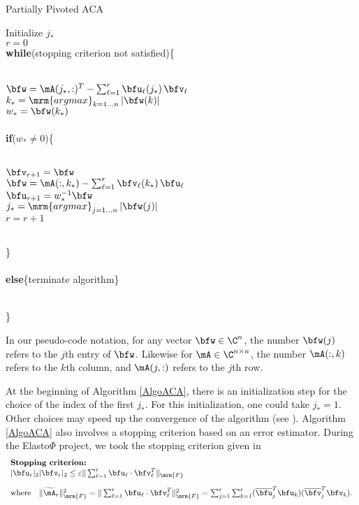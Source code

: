 \begin{algorithm}
  \caption{Partially Pivoted ACA}  
  \label{AlgoACA}
  Initialize $j_{*}$\\
  $r=0$\\
  \textbf{while}(stopping criterion not satisfied)\{\\\quad\\
  \indent\hspace{0.5cm} \parbox{\linewidth}{
    $\bfw = \mA(j_{*},:)^{T} - \sum_{\ell=1}^{r}\bfu_{\ell}(j_{*})\,\bfv_{\ell}$\\
    $k_{*} = \mathop{\mrm{argmax}}_{k = 1\dots n}\vert \bfw(k)\vert$\\
    $w_{*} = \bfw(k_{*})$\\\quad\\
    \textbf{if}($w_{*}\neq 0$)\{\\\quad\\
    \indent\hspace{0.5cm} \parbox{\linewidth}{
      $\bfv_{r+1} = \bfw$\\
      $\bfw = \mA(:,k_{*})-\sum_{\ell = 1}^{r}\bfv_{\ell}(k_{*})\,\bfu_{\ell} $\\
      $\bfu_{r+1} = w_{*}^{-1}\bfw$\\      
      $j_{*} = \mathop{\mrm{argmax}}_{j = 1\dots n} \vert \bfw(j)\vert$\\
      $r=r+1$
    }
    \quad\\
    \}\\\quad\\
    \textbf{else}\{terminate algorithm\}
    }\\
  \}

\end{algorithm}

\bigskip
In our pseudo-code notation, for any vector $\bfw\in \C^{n}$, the number $\bfw(j)$  refers to the $j$th entry of $\bfw$. 
Likewise for $\mA\in \C^{n\times n}$, the number $\mA(:,k)$ refers to the $k$th column, and $\mA(j,:)$ refers to the $j$th
row.

\bigskip
At the beginning of Algorithm \ref{AlgoACA}, there is an initialization step for the choice of the index of the first $j_{*}$. 
For this initialization, one could take $j_{*} = 1$. Other choices may speed up the convergence of the algorithm (see \cite[Section 3.4.3]{Bebendorf2008}). Algorithm \ref{AlgoACA} also involves a stopping criterion based on an error estimator. During the Elasto$\Phi$ 
project, we took the stopping criterion given in \cite{Rjasanow2007}
\begin{equation}
\label{eq:stopCrit}
\begin{array}{l}
\textbf{Stopping criterion:}\\ 
\vert \bfu_{r}\vert_{2}\vert \bfv_{r}\vert_{2}\leq  \varepsilon\Vert \sum_{\ell = 1}^{r}\bfu_{\ell}\cdot\bfv_{\ell}^{T}\Vert_{\mrm{F}}\\[10pt]
\textrm{where}\quad \Vert \widetilde{\mA}_{r} \Vert_{\mrm{F}}^2 =  \Vert \sum_{\ell = 1}^{r}\bfu_{\ell}\cdot\bfv_{\ell}^{T}\Vert_{\mrm{F}}^{2} = \sum_{j=1}^{r}\sum_{k=1}^{r}
(\overline{\bfu}_{j}^{T}\bfu_{k})(\overline{\bfv}_{j}^{T}\bfv_{k}).
\end{array}
\end{equation}


